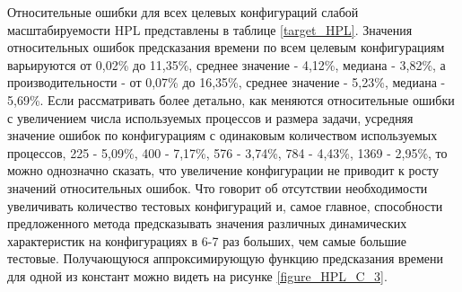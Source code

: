 		Относительные ошибки для всех целевых конфигураций слабой масштабируемости HPL представлены в таблице \eqref{target_HPL}. Значения относительных ошибок предсказания времени по всем целевым конфигурациям варьируются от 0,02\% до 11,35\%, среднее значение - 4,12\%, медиана - 3,82\%, а производительности - от 0,07\% до 16,35\%, среднее значение - 5,23\%, медиана - 5,69\%. Если рассматривать более детально, как меняются относительные ошибки с увеличением числа используемых процессов и размера задачи, усредняя значение ошибок по конфигурациям с одинаковым количеством используемых процессов, 225 - 5,09\%, 400 - 7,17\%, 576 - 3,74\%, 784 - 4,43\%, 1369 - 2,95\%, то можно однозначно сказать, что увеличение конфигурации не приводит к росту значений относительных ошибок. Что говорит об отсутствии необходимости увеличивать количество тестовых конфигураций и, самое главное, способности предложенного метода предсказывать значения различных динамических характеристик на конфигурациях в 6-7 раз больших, чем самые большие тестовые. Получающуюся аппроксимирующую функцию предсказания времени для одной из констант можно видеть на рисунке \eqref{figure_HPL_C_3}.

